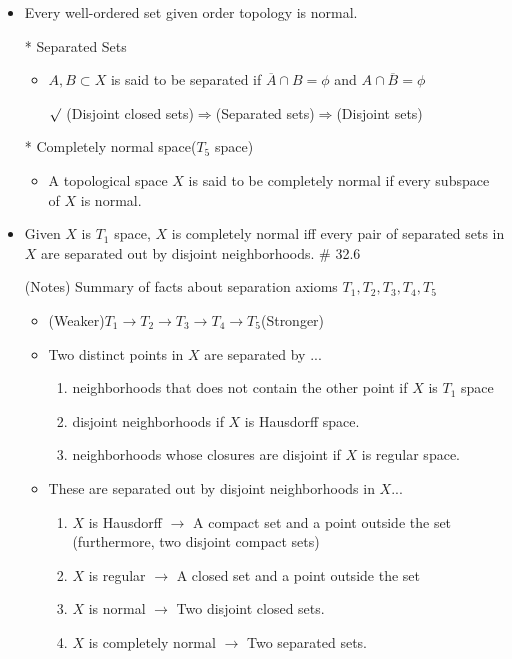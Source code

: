 \documentclass[12pt]{article}
\newcommand{\rmk}{$\surd$}
\newcommand{\cl}{\overline}
\begin{document}
\begin{itemize}
	\item Every well-ordered set given order topology is normal.
	\item[*] Separated Sets
	\begin{itemize}
		\item $A,B\subset X$ is said to be separated if $\cl{A}\cap B=\phi$ and $A\cap \cl{B}=\phi$
		\item[\rmk] (Disjoint closed sets)$\Rightarrow$(Separated sets)$\Rightarrow$(Disjoint sets) 
	\end{itemize}
\clearpage
	\item[*] Completely normal space($T_5$ space)
	\begin{itemize}
		\item A topological space $X$ is said to be completely normal if every subspace of $X$ is normal.
	\end{itemize}
	\item Given $X$ is $T_1$ space, $X$ is completely normal iff every pair of separated sets in  $X$  are separated out by disjoint neighborhoods.  \quad \# 32.6
	\\
	\item[(Notes)] Summary of facts about separation axioms $T_1, T_2, T_3, T_4, T_5$
	\begin{itemize}
		\item (Weaker)\;$T_1\rightarrow T_2 \rightarrow T_3 \rightarrow T_4 \rightarrow T_5$\;(Stronger)
		\item Two distinct points in $X$ are separated by ...
		\begin{enumerate}
			\item neighborhoods that does not contain the other point if $X$ is $T_1$ space
			\item disjoint neighborhoods if $X$ is Hausdorff space.
			\item neighborhoods whose closures are disjoint if $X$ is regular space.
		\end{enumerate}
		\item These are separated out by disjoint neighborhoods in $X$...
		\begin{enumerate}
			\item $X$ is Hausdorff $\rightarrow$ A compact set and a point outside the set (furthermore, two disjoint compact sets)
			\item $X$ is regular $\rightarrow$ A closed set and a point outside the set
			\item $X$ is normal $\rightarrow$ Two disjoint closed sets. 
			\item $X$ is completely normal $\rightarrow$ Two separated sets. 

\end{enumerate}
\end{itemize}
\end{itemize}
\end{document}
